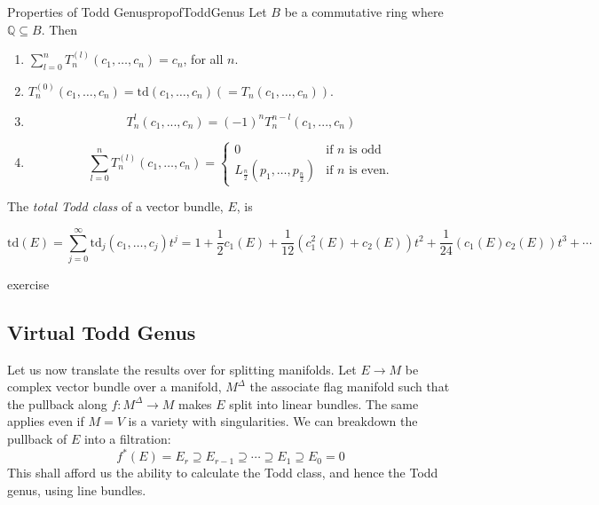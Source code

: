 \documentclass{book}
\newenvironment{Proof}[1][]
  {\begin{ProofTcb}[#1]}
  {\end{ProofTcb}}
\newcommand{\Q}{{\mathbb{Q}}}
\newcommand{\sse}{\subseteq}
\begin{document}
\begin{prop}{Properties of Todd Genus}{propofToddGenus}
  Let $B$ be a commutative ring where $\Q \sse B$. Then
  \begin{enumerate}
  \item $\sum_{l=0}^n T_n^{(l)}(c_1,\ldots,c_n) = c_n$, for all $n$.

  \item $T_n^{(0)}(c_1,\ldots,c_n) = \text{td}(c_1,\ldots,c_n) (= T_n(c_1,\ldots,c_n))$.
    \item
  \[
    T_n^{l}(c_1, ..., c_n)=(-1)^n T_n^{n-l}(c_1, ..., c_n)
  \]
  \item
  \[
      \sum_{l=0}^n T_n^{(l)}(c_1,\ldots,c_n) = \begin{cases}
          0 & \text{if }n\text{ is odd} \\
          L_{\frac{n}{2}}(p_1,\ldots,p_{\frac{n}{2}}) & \text{if }n\text{ is even.}
      \end{cases}
  \]
  \end{enumerate}

  The \textit{total Todd class} of a vector bundle, $E$, is

\[
    \text{td}(E) = \sum_{j=0}^{\infty} \text{td}_j(c_1,\ldots,c_j)t^j = 1 + \frac{1}{2}c_1(E) + \frac{1}{12}(c_1^2(E) + c_2(E))t^2 + \frac{1}{24}(c_1(E)c_2(E))t^3 + \cdots
\]

\end{prop}

\begin{Proof}
  exercise
\end{Proof}


\subsection{Virtual Todd Genus}\label{sec:virtToddGenus}

Let us now translate the results over for splitting manifolds. Let $E \to M$ be complex vector bundle over a
manifold, $M^\Delta$ the associate flag manifold such that the pullback along $f: M^\Delta \to M$ makes $E$ split into
linear bundles. The same applies even if $M = V$ is a variety with singularities. We can breakdown the
pullback of $E$ into a filtration:
\[
  f^*(E) = E_r \supseteq E_{r-1} \supseteq \cdots \supseteq E_1 \supseteq E_0  =0
\]
This shall afford us the ability to calculate the Todd class, and hence the Todd genus, using line bundles.
\end{document}
